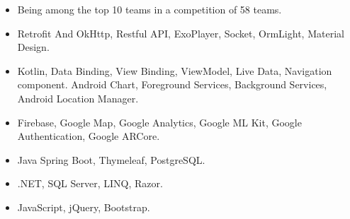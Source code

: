 \documentclass[10pt,a4paper,ragged2e,withhyper]{altacv}
\begin{document}
\begin{paracol}{2}
\divider

\begin{itemize}
\item Being among the top 10 teams in a competition of 58 teams.
\end{itemize}


\begin{itemize}
\item Retrofit And OkHttp,  Restful API, ExoPlayer, Socket, OrmLight, Material Design.
\smallskip
\item Kotlin, Data Binding, View Binding, ViewModel, Live Data, Navigation component. Android Chart, Foreground Services, Background Services, Android Location Manager.
\smallskip
\item Firebase, Google Map, Google Analytics, Google ML Kit, Google Authentication, Google 
ARCore.
\smallskip
\item  Java Spring Boot, Thymeleaf, PostgreSQL.
\smallskip
\item .NET, SQL Server, LINQ, Razor.
\smallskip
\item  JavaScript, jQuery, Bootstrap.
\end{itemize}



\end{paracol}
\end{document}
